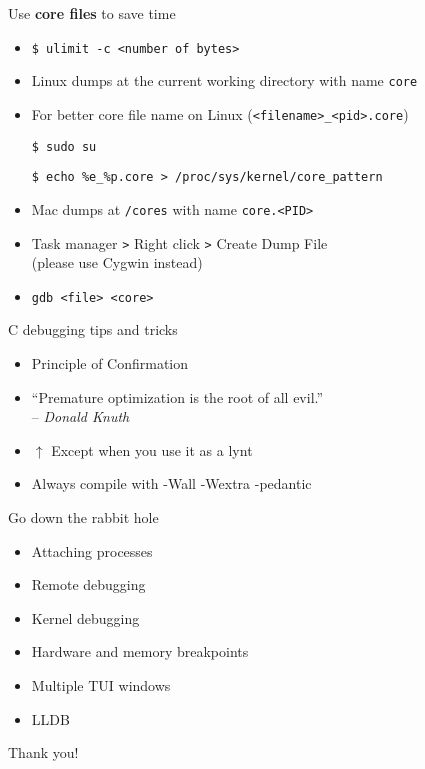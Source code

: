 \documentclass{beamer}
\begin{document}
  \begin{frame}{Use \textbf{core files} to save time}
    \begin{itemize}
      \item \texttt{\$ ulimit -c <number of bytes>} 
      \item Linux dumps at the current working directory with name \texttt{core}
      \item For better core file name on Linux (\texttt{<filename>\_<pid>.core})

        \texttt{\$ sudo su}

        \texttt{\$ echo \%e\_\%p.core > /proc/sys/kernel/core\_pattern}
      \item Mac dumps at \texttt{/cores} with name \texttt{core.<PID>}
      \item Task manager \texttt{>} Right click \texttt{>} Create Dump File \\
        {\scriptsize (please use Cygwin instead)}
      \item \texttt{gdb <file> <core>}
    \end{itemize}
  \end{frame}

  \begin{frame}{C debugging tips and tricks}
    \begin{itemize}
      \item Principle of Confirmation
      \item ``Premature optimization is the root of all evil.'' \\
        \hfill -- \textsl{Donald Knuth}
      \item $\uparrow$ Except when you use it as a lynt
      \item Always compile with -Wall -Wextra -pedantic
    \end{itemize}
  \end{frame}

  \begin{frame}{Go down the rabbit hole}
    \begin{itemize}
      \item Attaching processes
      \item Remote debugging 
      \item Kernel debugging
      \item Hardware and memory breakpoints
      \item Multiple TUI windows
      \item LLDB
    \end{itemize}
  \end{frame}

  \begin{frame}
    \begin{center}
      {\LARGE Thank you!}
    \end{center}
  \end{frame}
\end{document}
